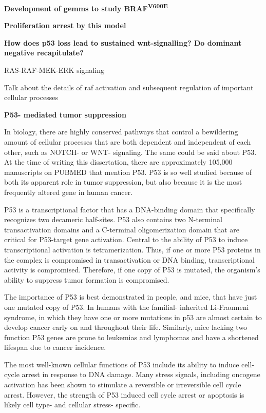 \textbf{Development of gemms to study BRAF\textsuperscript{V600E}}

\textbf{Proliferation arrest by this model}

\textbf{How does p53 loss lead to sustained wnt-signalling? Do dominant negative recapitulate?}

RAS-RAF-MEK-ERK signaling

Talk about the details of raf activation and subsequent regulation of important cellular processes

\textbf{P53- mediated tumor suppression}

In biology, there are highly conserved pathways that control a bewildering amount of cellular processes that are both dependent and independent of each other, such as NOTCH- or WNT- signaling. The same could be said about P53. At the time of writing this dissertation, there are approximately 105,000 manuscripts on PUBMED that mention P53. P53 is so well studied because of both its apparent role in tumor suppression, but also because it is the most frequently altered gene in human cancer.

P53 is a transcriptional factor that has a DNA-binding domain that specifically recognizes two decameric half-sites. P53 also contains two N-terminal transactivation domains and a C-terminal oligomerization domain that are critical for P53-target gene activation. Central to the ability of P53 to induce transcriptional activation is tetramerization. Thus, if one or more P53 proteins in the complex is compromised in transactivation or DNA binding, transcriptional activity is compromised. Therefore, if one copy of P53 is mutated, the organism's ability to suppress tumor formation is compromised.

The importance of P53 is best demonstrated in people, and mice, that have just one mutated copy of P53. In humans with the familial- inherited Li-Fraumeni syndrome, in which they have one or more mutations in p53 are almost certain to develop cancer early on and throughout their life. Similarly, mice lacking two function P53 genes are prone to leukemias and lymphomas and have a shortened lifespan due to cancer incidence.

The most well-known cellular functions of P53 include its ability to induce cell-cycle arrest in response to DNA damage. Many stress signals, including oncogene activation has been shown to stimulate a reversible or irreversible cell cycle arrest. However, the strength of P53 induced cell cycle arrest or apoptosis is likely cell type- and cellular stress- specific.

